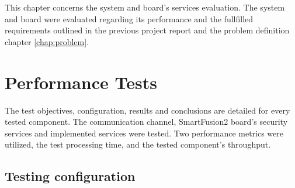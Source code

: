\cleardoublepage
\label{chap:evaluation}

This chapter concerns the system and board's services evaluation. The system and board were evaluated regarding its performance and the fullfilled requirements outlined in the previous project report and the problem definition chapter \ref{chap:problem}.
\section{Performance Tests}\label{chap:evaluation:performance}

The test objectives, configuration, results and conclusions are detailed for every tested component.
The communication channel, SmartFusion2 board's security services and implemented services were tested.
Two performance metrics were utilized, the test processing time, and the tested component's throughput.

\subsection{Testing configuration}\label{chap:evaluation:performance:config}

